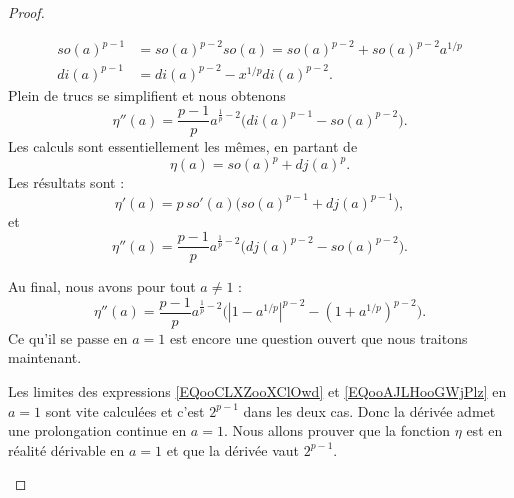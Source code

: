 \begin{proof}
\begin{subproof}
\begin{subequations}
					\begin{align}
						so(a)^{p-1} & =so(a)^{p-2}so(a)=so(a)^{p-2}+so(a)^{p-2}a^{1/p} \\
						di(a)^{p-1} & =di(a)^{p-2}-x^{1/p}di(a)^{p-2}.
					\end{align}
				\end{subequations}
				Plein de trucs se simplifient et nous obtenons
				\begin{equation}
					\eta''(a)=\frac{ p-1 }{ p }a^{\frac{1}{ p }-2}\big( di(a)^{p-1}-so(a)^{p-2} \big).
				\end{equation}
				\spitem[Pour \( a>1\)]
				Les calculs sont essentiellement les mêmes, en partant de
				\begin{equation}
					\eta(a)=so(a)^p+dj(a)^p.
				\end{equation}
				Les résultats sont :
				\begin{equation}    \label{EQooAJLHooGWjPlz}
					\eta'(a)=p\,so'(a)\big( so(a)^{p-1}+dj(a)^{p-1} \big),
				\end{equation}
				et
				\begin{equation}
					\eta''(a)=\frac{ p-1 }{ p }a^{\frac{1}{ p }-2}\big( dj(a)^{p-2}-so(a)^{p-2} \big).
				\end{equation}
			\end{subproof}
			Au final, nous avons pour tout \( a\neq 1\) :
			\begin{equation}
				\eta''(a)=\frac{ p-1 }{ p }a^{\frac{1}{ p }-2}\big( | 1-a^{1/p} |^{p-2}-(1+a^{1/p})^{p-2} \big).
			\end{equation}
			Ce qu'il se passe en \( a=1\) est encore une question ouvert que nous traitons maintenant.
			\begin{subproof}
				\spitem[Pour \( a=1\)]
				Les limites des expressions \eqref{EQooCLXZooXClOwd} et \eqref{EQooAJLHooGWjPlz} en \( a=1\) sont vite calculées et c'est \( 2^{p-1}\) dans les deux cas. Donc la dérivée admet une prolongation continue en \( a=1\). Nous allons prouver que la fonction \( \eta\) est en réalité dérivable en \( a=1\) et que la dérivée vaut \( 2^{p-1}\).


\end{subproof}
\end{proof}
